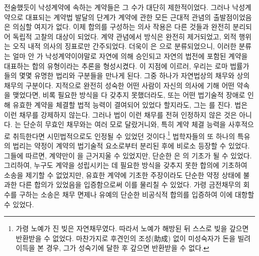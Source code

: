 전술했듯이 낙성계약에 속하는 계약들은 그 수가 대단히 제한적이었다.
그러나
낙성계약으로 대표되는 계약법 발달의 단계가
계약에 관한 모든 근대적 관념의 출발점이었음은 의심할 여지가 없다.
이제 합의를 구성하는 의사 작용은
다른 것들과 완전히 분리되어 독립적 고찰의 대상이 되었다.
계약 관념에서 방식은 완전히 제거되었고,
외적 행위는 오직 내적 의사의 징표로만 간주되었다.
더욱이 은 으로 분류되었으니,
이러한 분류는
얼마 안 가
낙성계약이야말로
자연에 의해 승인되고 자연의 법전에 포함된
계약을 대표하는 합의 유형이라는 추론을 형성시켰다.
이 지점에 이르러, 우리는
로마 법률가들의 몇몇 유명한 법리와 구분들을 만나게 된다.
그중 하나가 자연법상의 채무와
상의 채무의 구분이다.
지적으로 완전히 성숙한 어떤 사람이
자신의 의사에 기해
어떤 약속을 맺었다면,
비록 필요한 방식을 다 갖추지 못했더라도,
또는 어떤 법기술적 장애로 인해
유효한 계약을 체결할 법적 능력이 결여되어 있었다 할지라도,
그는 를 진다.
법은
이런 채무를 강제하지 않는다.
그러나 법이 이런 채무를 전혀 인정하지 않은 것은 아니다.
는
단순히 무효인 채무와는 여러 모로 달랐거니와,
특히 계약 체결 능력을 사후적으로 취득한다면
시민법적으로도 인정될 수 있었던 것이다.\footnote{%
  가령 노예가 진 빚은 자연채무였다. 따라서 노예가 해방된 뒤
  스스로 빚을 갚으면 반환받을 수 없었다.
  마찬가지로 후견인의 조성(助成) 없이 미성숙자가 돈을 빌려 이득을 본 경우,
  그가 성숙기에 달한 후 갚으면 반환받을 수 없다.
  }
법학자들의 또 하나의 특유의 법리는 약정이
계약의 법기술적 요소로부터 분리된 후에 비로소 등장할 수 있었다.
그들에 따르면,
계약만이 을 근거지울 수 있었지만,
단순한 은 의 기초가 될 수 있었다.
그리하여,
누구도
계약을 성립시키는 데 필요한
방식을 갖추지 못한
합의에 기초하여 소송을 제기할 수 없었지만,
유효한 계약에 기초한 주장이라도
단순한 약정 상태에 불과한 다른 합의가 있었음을 입증함으로써
이를 물리칠 수 있었다.
가령 금전채무의 회수를 구하는 소송은
채무 면제나 유예의
단순한 비공식적 합의를 입증하여 이에 대항할 수 있었다.

